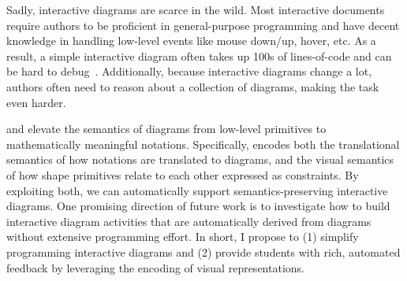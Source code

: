 Sadly, interactive diagrams are scarce in the wild. Most interactive documents require authors to be proficient in general-purpose programming and have decent knowledge in handling low-level events like mouse down/up, hover, etc. As a result, a simple interactive diagram often takes up 100s of lines-of-code and can be hard to debug~\cite{callbackSpaghetti, letondal_usability_2010}. Additionally, because interactive diagrams change a lot, authors often need to reason about a collection of diagrams, making the task even harder.

\Penrose and \Edgeworth elevate the semantics of diagrams from low-level primitives to mathematically meaningful notations. Specifically, \Penrose encodes both the translational semantics of how notations are translated to diagrams, and the visual semantics of how shape primitives relate to each other expressed as constraints. By exploiting both, we can automatically support semantics-preserving interactive diagrams. One promising direction of future work is to investigate how to build interactive diagram activities that are automatically derived from \Penrose diagrams without extensive programming effort. In short, I propose to (1) simplify programming interactive diagrams and (2) provide students with rich, automated feedback by leveraging the encoding of visual representations. 





